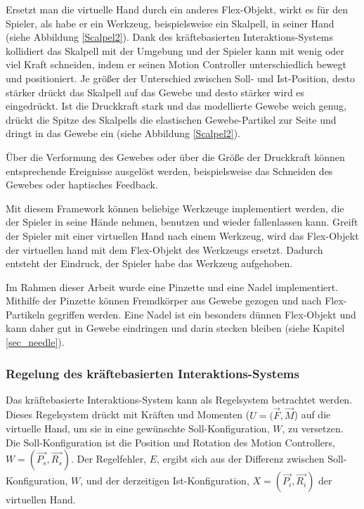 Ersetzt man die virtuelle Hand durch ein anderes Flex-Objekt, wirkt es für den Spieler, als habe er ein Werkzeug, beispielsweise ein Skalpell, in seiner Hand (siehe Abbildung \ref{Scalpel2}). 
Dank des kräftebasierten Interaktions-Systems kollidiert das Skalpell mit der Umgebung und der Spieler kann mit wenig oder viel Kraft schneiden, indem er seinen Motion Controller unterschiedlich bewegt und positioniert. Je größer der Unterschied zwischen Soll- und Ist-Position, desto stärker drückt das Skalpell auf das Gewebe und desto stärker wird es eingedrückt. Ist die Druckkraft stark und das modellierte Gewebe weich genug, drückt die Spitze des Skalpells die elastischen Gewebe-Partikel zur Seite und dringt in das Gewebe ein (siehe Abbildung \ref{Scalpel2}).


Über die Verformung des Gewebes oder über die Größe der Druckkraft können entsprechende Ereignisse ausgelöst werden, beispielsweise das Schneiden des Gewebes oder haptisches Feedback.

Mit diesem Framework können beliebige Werkzeuge implementiert werden, die der Spieler in seine Hände nehmen, benutzen und wieder fallenlassen kann. Greift der Spieler mit einer virtuellen Hand nach einem Werkzeug, wird das Flex-Objekt der virtuellen hand mit dem Flex-Objekt des Werkzeugs ersetzt. Dadurch entsteht der Eindruck, der Spieler habe das Werkzeug aufgehoben.

Im Rahmen dieser Arbeit wurde eine Pinzette und eine Nadel implementiert. Mithilfe der Pinzette können Fremdkörper aus Gewebe gezogen und nach Flex-Partikeln gegriffen werden. Eine Nadel ist ein besonders dünnen Flex-Objekt und kann daher gut in Gewebe eindringen und darin stecken bleiben (siehe Kapitel \ref{sec_needle}).

\subsubsection{Regelung des kräftebasierten Interaktions-Systems}
Das kräftebasierte Interaktions-System kann als Regelsystem betrachtet werden. Dieses Regelsystem drückt mit Kräften und Momenten ($U = (\vec{F} , \vec{M}$) auf die virtuelle Hand, um sie in eine gewünschte Soll-Konfiguration, $W$, zu versetzen. Die Soll-Konfiguration ist die Position und Rotation des Motion Controllers, $W = (\vec{P_s} , \vec{R_s})$. Der Regelfehler, $E$, ergibt sich aus der Differenz zwischen Soll-Konfiguration, $W$, und der derzeitigen Ist-Konfiguration, $X = (\vec{P_i} , \vec{R_i})$ der virtuellen Hand.

